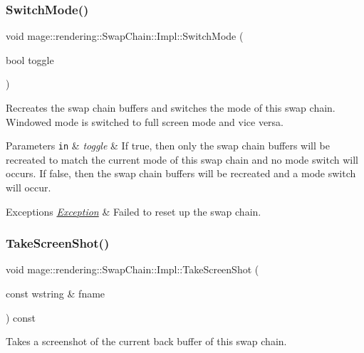 \subsubsection{\texorpdfstring{Switch\+Mode()}{SwitchMode()}}
{\footnotesize\ttfamily void mage\+::rendering\+::\+Swap\+Chain\+::\+Impl\+::\+Switch\+Mode (\begin{DoxyParamCaption}\item[{bool}]{toggle }\end{DoxyParamCaption})}

Recreates the swap chain buffers and switches the mode of this swap chain. Windowed mode is switched to full screen mode and vice versa.


\begin{DoxyParams}[1]{Parameters}
\mbox{\tt in}  & {\em toggle} & If {\ttfamily true}, then only the swap chain buffers will be recreated to match the current mode of this swap chain and no mode switch will occurs. If {\ttfamily false}, then the swap chain buffers will be recreated and a mode switch will occur. \\
\hline
\end{DoxyParams}

\begin{DoxyExceptions}{Exceptions}
{\em \hyperlink{classmage_1_1_exception}{Exception}} & Failed to reset up the swap chain. \\
\hline
\end{DoxyExceptions}
\hypertarget{classmage_1_1rendering_1_1_swap_chain_1_1_impl_abdc55ba548c3178ab3edbeeb39099a4c}{}\label{classmage_1_1rendering_1_1_swap_chain_1_1_impl_abdc55ba548c3178ab3edbeeb39099a4c} 
\subsubsection{\texorpdfstring{Take\+Screen\+Shot()}{TakeScreenShot()}}
{\footnotesize\ttfamily void mage\+::rendering\+::\+Swap\+Chain\+::\+Impl\+::\+Take\+Screen\+Shot (\begin{DoxyParamCaption}\item[{const wstring \&}]{fname }\end{DoxyParamCaption}) const}

Takes a screenshot of the current back buffer of this swap chain.



